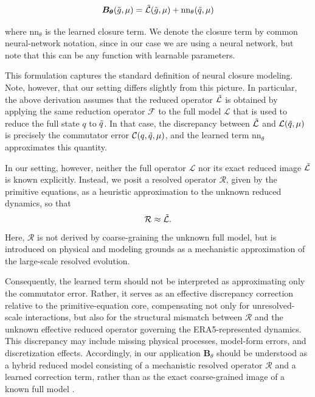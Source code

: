\begin{equation}
    \label{eq:reducedmodel}
    \boldsymbol{B_{\theta}}(\Tilde{g}, \mu) =  \Tilde{\mathcal{L}}(\Tilde{g}, \mu) + \mathrm{nn}_{\theta}(\Tilde{q},\mu)
\end{equation}

where $\mathrm{nn}_{\theta}$ is the learned closure term. We denote the closure term by common neural-network notation, since in our case we are using a neural network, but note that this can be any function with learnable parameters.

This formulation captures the standard definition of neural closure modeling. Note, however, that our setting differs slightly from this picture. In particular, the above derivation assumes that the reduced operator $\Tilde{\mathcal{L}}$ is obtained by applying the same reduction operator $\mathcal{F}$ to the full model $\mathcal{L}$ that is used to reduce the full state $q$ to $\Tilde{q}$. In that case, the discrepancy between $\Tilde{\mathcal{L}}$ and $\mathcal{L}(\Tilde{q},\mu)$ is precisely the commutator error $\mathcal{C}(q,\Tilde{q},\mu)$, and the learned term $\mathrm{nn}_\theta$ approximates this quantity.

In our setting, however, neither the full operator $\mathcal{L}$ nor its exact reduced image $\Tilde{\mathcal{L}}$ is known explicitly. Instead, we posit a resolved operator $\mathcal{R}$, given by the primitive equations, as a heuristic approximation to the unknown reduced dynamics, so that
\[
\mathcal{R} \approx \Tilde{\mathcal{L}}.
\]
Here, $\mathcal{R}$ is not derived by coarse-graining the unknown full model, but is introduced on physical and modeling grounds as a mechanistic approximation of the large-scale resolved evolution.

Consequently, the learned term should not be interpreted as approximating only the commutator error. Rather, it serves as an effective discrepancy correction relative to the primitive-equation core, compensating not only for unresolved-scale interactions, but also for the structural mismatch between $\mathcal{R}$ and the unknown effective reduced operator governing the ERA5-represented dynamics. This discrepancy may include missing physical processes, model-form errors, and discretization effects. Accordingly, in our application $\boldsymbol{B}_\theta$ should be understood as a hybrid reduced model consisting of a mechanistic resolved operator $\mathcal{R}$ and a learned correction term, rather than as the exact coarse-grained image of a known full model \cite{Sanderse2025}.

